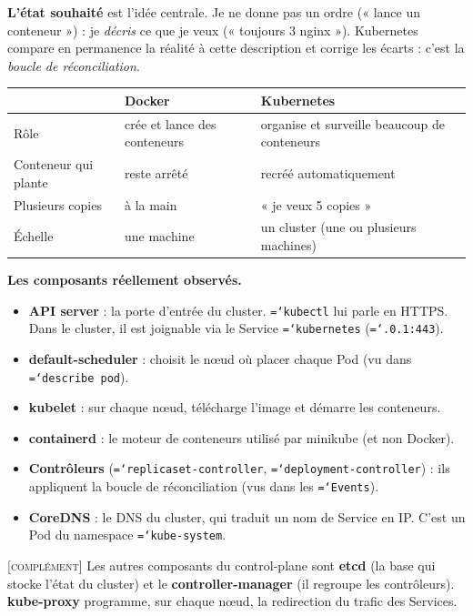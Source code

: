 \documentclass[11pt,a4paper]{article}
\newcommand{\cmd}[1]{\texttt{\hyphenchar\font=`\-#1}}
\newcommand{\compl}{\textsc{[complément]}}
\begin{document}
\textbf{L'état souhaité} est l'idée centrale. Je ne donne pas un ordre (« lance un conteneur ») : je \emph{décris} ce que je veux (« toujours 3 nginx »). Kubernetes compare en permanence la réalité à cette description et corrige les écarts : c'est la \emph{boucle de réconciliation}.

\begin{center}
\begin{tabularx}{\linewidth}{@{}lXX@{}}
\toprule
 & \textbf{Docker} & \textbf{Kubernetes} \\
\midrule
Rôle & crée et lance des conteneurs & organise et surveille beaucoup de conteneurs \\
Conteneur qui plante & reste arrêté & recréé automatiquement \\
Plusieurs copies & à la main & « je veux 5 copies » \\
Échelle & une machine & un cluster (une ou plusieurs machines) \\
\bottomrule
\end{tabularx}
\end{center}

\textbf{Les composants réellement observés.}
\begin{itemize}
  \item \textbf{API server} : la porte d'entrée du cluster. \cmd{kubectl} lui parle en HTTPS. Dans le cluster, il est joignable via le Service \cmd{kubernetes} (\cmd{10.96.0.1:443}).
  \item \textbf{default-scheduler} : choisit le nœud où placer chaque Pod (vu dans \cmd{describe pod}).
  \item \textbf{kubelet} : sur chaque nœud, télécharge l'image et démarre les conteneurs.
  \item \textbf{containerd} : le moteur de conteneurs utilisé par minikube (et non Docker).
  \item \textbf{Contrôleurs} (\cmd{replicaset-controller}, \cmd{deployment-controller}) : ils appliquent la boucle de réconciliation (vus dans les \cmd{Events}).
  \item \textbf{CoreDNS} : le DNS du cluster, qui traduit un nom de Service en IP. C'est un Pod du namespace \cmd{kube-system}.
\end{itemize}
\compl{} Les autres composants du control-plane sont \textbf{etcd} (la base qui stocke l'état du cluster) et le \textbf{controller-manager} (il regroupe les contrôleurs). \textbf{kube-proxy} programme, sur chaque nœud, la redirection du trafic des Services.
\end{document}
